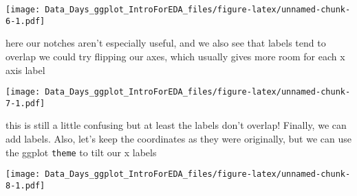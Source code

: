 \documentclass[
]{article}
\newenvironment{Shaded}{\begin{snugshade}}{\end{snugshade}}
\newcommand{\DataTypeTok}[1]{\textcolor[rgb]{0.13,0.29,0.53}{#1}}
\newcommand{\DecValTok}[1]{\textcolor[rgb]{0.00,0.00,0.81}{#1}}
\newcommand{\KeywordTok}[1]{\textcolor[rgb]{0.13,0.29,0.53}{\textbf{#1}}}
\newcommand{\NormalTok}[1]{#1}
\newcommand{\OperatorTok}[1]{\textcolor[rgb]{0.81,0.36,0.00}{\textbf{#1}}}
\newcommand{\StringTok}[1]{\textcolor[rgb]{0.31,0.60,0.02}{#1}}
\begin{document}
\texttt{[image: Data\_Days\_ggplot\_IntroForEDA\_files/figure-latex/unnamed-chunk-6-1.pdf]}

here our notches aren't especially useful, and we also see that labels
tend to overlap we could try flipping our axes, which usually gives more
room for each x axis label

\begin{Shaded}
\end{Shaded}

\texttt{[image: Data\_Days\_ggplot\_IntroForEDA\_files/figure-latex/unnamed-chunk-7-1.pdf]}

this is still a little confusing but at least the labels don't overlap!
Finally, we can add labels. Also, let's keep the coordinates as they
were originally, but we can use the ggplot \texttt{theme} to tilt our x
labels

\begin{Shaded}
\end{Shaded}

\texttt{[image: Data\_Days\_ggplot\_IntroForEDA\_files/figure-latex/unnamed-chunk-8-1.pdf]}
\end{document}
